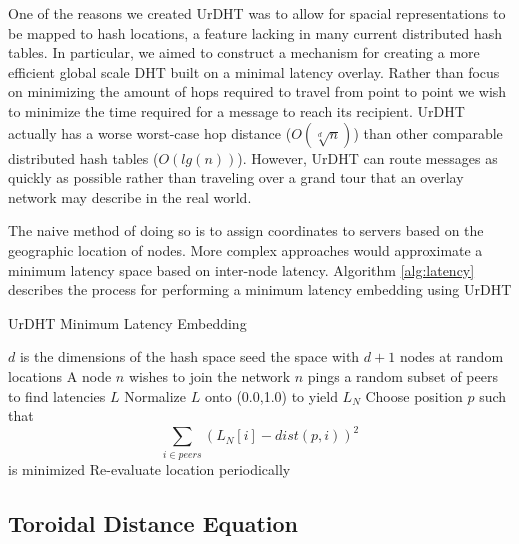 \documentclass[11pt]{IEEEtran} %
\begin{document}
One of the reasons we created UrDHT \cite{urdht} was to allow for spacial representations to be mapped to hash locations, a feature lacking in many current distributed hash tables.  
In particular, we aimed to construct a mechanism for creating a more efficient global scale DHT built on a minimal latency overlay. 
Rather than focus on minimizing the amount of hops required to travel from point to point we wish to minimize the time required for a message to reach its recipient. 
UrDHT actually has a worse worst-case hop distance ($O(\sqrt[d]{n})$) than other comparable distributed hash tables ($O(lg(n))$). 
However, UrDHT can route messages as quickly as possible rather than traveling over a grand tour that an overlay network may describe in the real world.



The naive method of doing so is to assign coordinates to servers based on the geographic location of nodes. More complex approaches would approximate a minimum latency space based on inter-node latency.
Algorithm \ref{alg:latency} describes the process for performing a minimum latency embedding using UrDHT









\begin{algorithm}
\caption{UrDHT Minimum Latency Embedding}
\label{alg:latency}
\begin{algorithmic}[1]  %
	\STATE $d$ is the dimensions of the hash space
    \STATE seed the space with $d+1$ nodes at random locations
   	\STATE A node $n$ wishes to join the network
    \STATE $n$ pings a random subset of peers to find latencies $L$
    \STATE Normalize $L$ onto (0.0,1.0) to yield $L_N$
    \STATE Choose position $p$ such that $$\sum\limits_{i\in peers}(L_N[i]-dist(p,i))^2$$ is minimized
    \STATE Re-evaluate location periodically
\end{algorithmic}
\end{algorithm}







\subsection{Toroidal Distance Equation}
\end{document}
